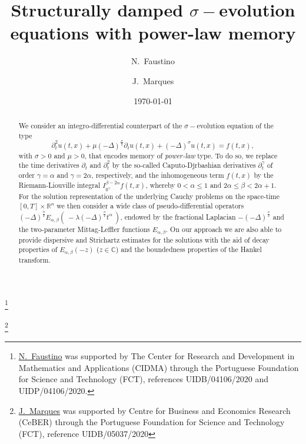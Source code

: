 \documentclass{amsart}
\theoremstyle{definition}
\theoremstyle{remark}
\numberwithin{equation}{section}
\begin{document}
	
	
\title[Structurally damped $\sigma-$evolution equations with power-law memory]
{Structurally damped $\sigma-$evolution equations with power-law memory}



\author{{N.~Faustino}}
\address[\textsc{N.~Faustino}]{Department of Mathematics, University of Aveiro, Campus Universit\'ario de Santiago, 3810-193 Aveiro, Portugal}
\address[\textsc{N.~Faustino}]{Center for R\&D in Mathematics and Applications (CIDMA), Department of Mathematics, University of Aveiro, Campus Universit\'ario de Santiago, 3810-193 Aveiro, Portugal}
\thanks{\href{http://orcid.org/0000-0002-9117-2021}{N.~Faustino} was supported by The Center for Research and Development in Mathematics and Applications (CIDMA) through the Portuguese Foundation for Science and Technology (FCT), references UIDB/04106/2020 and UIDP/04106/2020.}

\author{{J.~Marques}}
\address[\textsc{J. Marques}]{Faculty of Economics and CeBER, University of Coimbra,
	Av. Dias da Silva, 165,
	3004-512 Coimbra,
	Portugal}
\thanks{\href{https://orcid.org/0000-0003-3825-6389}{J.~Marques} was supported by Centre for Business and Economics Research (CeBER) through the Portuguese Foundation for Science and Technology (FCT), reference UIDB/05037/2020}

\date{\today}


\begin{abstract}
We
consider an integro-differential counterpart of the $\sigma-$evolution equation of the type
\[
\partial_t^2 u(t,x)+\mu (-\Delta)^{\frac{\sigma}{2}} \partial_t u(t,x)+(-\Delta)^\sigma u(t,x)=f(t,x),
\]
with $\sigma>0$ and $\mu>0$, that encodes memory of \textit{power-law} type. To do so, we replace the time derivatives $\partial_t$ and $\partial_t^2$ by the so-called Caputo-Djrbashian derivatives $\partial_t^\gamma$ of order $\gamma=\alpha$ and $\gamma=2\alpha$, respectively, and the inhomogeneous term $f(t,x)$ by the Riemann-Liouville integral $I^{\beta-2\alpha}_{0^+}f(t,x)$, whereby $0<\alpha\leq 1$ and $2\alpha\leq \beta<2\alpha+1$.
For the solution representation of the underlying Cauchy problems on the space-time $[0,T]\times \mathbb{R}^n$ we then consider a wide class of pseudo-differential operators $\displaystyle (-\Delta)^{\frac{\eta}{2}}E_{\alpha,\beta}\left(~-\lambda(-\Delta)^{\frac{\sigma}{2}} t^\alpha~\right)$, endowed by the  fractional Laplacian $-(-\Delta)^{\frac{\sigma}{2}}$ and the two-parameter Mittag-Leffler functions $E_{\alpha,\beta}$. 
On our approach we are also able to provide dispersive and Strichartz estimates for the solutions with the aid of decay properties of $E_{\alpha,\beta}(-z)$ ($z\in \mathbb{C}$) and the boundedness properties of the Hankel transform.

\end{abstract}
\end{document}

